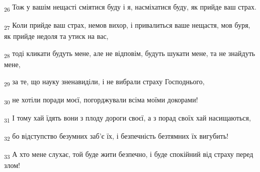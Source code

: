 \begin{tcolorbox}
\textsubscript{26} Тож у вашім нещасті сміятися буду і я, насміхатися буду, як прийде ваш страх.
\end{tcolorbox}
\begin{tcolorbox}
\textsubscript{27} Коли прийде ваш страх, немов вихор, і привалиться ваше нещастя, мов буря, як прийде недоля та утиск на вас,
\end{tcolorbox}
\begin{tcolorbox}
\textsubscript{28} тоді кликати будуть мене, але не відповім, будуть шукати мене, та не знайдуть мене,
\end{tcolorbox}
\begin{tcolorbox}
\textsubscript{29} за те, що науку зненавиділи, і не вибрали страху Господнього,
\end{tcolorbox}
\begin{tcolorbox}
\textsubscript{30} не хотіли поради моєї, погорджували всіма моїми докорами!
\end{tcolorbox}
\begin{tcolorbox}
\textsubscript{31} І тому хай їдять вони з плоду дороги своєї, а з порад своїх хай насищаються,
\end{tcolorbox}
\begin{tcolorbox}
\textsubscript{32} бо відступство безумних заб'є їх, і безпечність безтямних їх вигубить!
\end{tcolorbox}
\begin{tcolorbox}
\textsubscript{33} А хто мене слухає, той буде жити безпечно, і буде спокійний від страху перед злом!
\end{tcolorbox}

